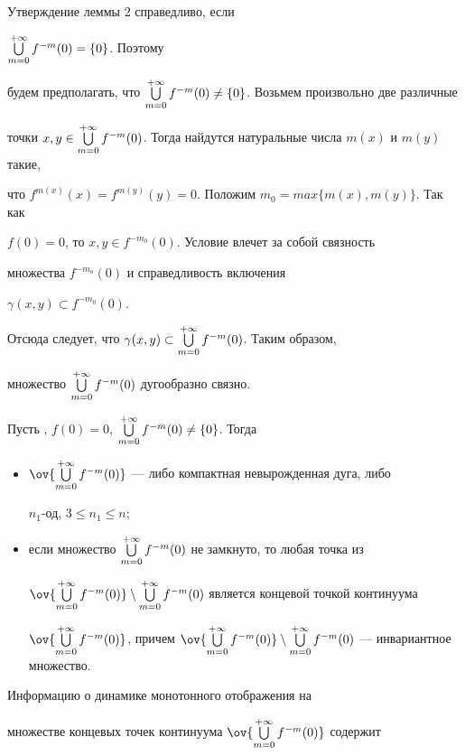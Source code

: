 \begin{pf} Утверждение леммы 2 справедливо, если


$\bigcup\limits_{m=0}^{+\infty}f^{-m}(0) =\{0\}$. Поэтому


будем предполагать, что $\bigcup\limits_{m=0}^{+\infty}f^{-m}(0) \ne \{0\}$. Возьмем произвольно две различные


точки $x,y\in \bigcup\limits_{m=0}^{+\infty}f^{-m}(0)$. Тогда найдутся натуральные числа $m(x)$ и $m(y)$ такие,


что $f^{m(x)}(x)=f^{m(y)}(y)=0$. Положим $m_0=max\{m(x),m(y)\}$. Так как


$f(0)=0$, то $x,y\in f^{-m_0}(0)$. Условие \fm влечет за собой связность


множества $f^{-m_o}(0)$ и справедливость включения


$\gamma (x,y)\subset f^{-m_0}(0)$.


Отсюда следует, что $\gamma (x,y)\subset \bigcup\limits_{m=0}^{+\infty}f^{-m}(0)$. Таким образом,


множество $\bigcup\limits_{m=0}^{+\infty}f^{-m}(0)$ дугообразно связно.


\end{pf}





\begin{cor} Пусть \fm{}, $f(0)=0$, $\bigcup\limits_{m=0}^{+\infty}f^{-m}(0) \ne \{0\}$. Тогда


\begin{itemize}


\item[1.1.] $\ov{\ty }$ --- либо компактная невырожденная дуга, либо


$n_1$-од, $3\le n_1\le n$;


\item[1.2.] если множество $\bigcup\limits_{m=0}^{+\infty}f^{-m}(0) $ не замкнуто, то любая точка из


$\ov{\ty}\setminus \ty $ является концевой точкой континуума


$\ov{\ty}$, причем $\ov{\ty}\setminus \ty$ --- инвариантное множество.


\end{itemize}


\end{cor}





Информацию о динамике монотонного отображения на


множестве концевых точек континуума $\ov{\ty }$ содержит





